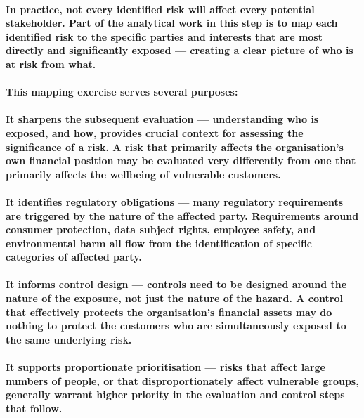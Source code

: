 \paragraph{In practice, not every identified risk will affect every potential stakeholder. Part of the analytical work in this step is to map each identified risk to the specific parties and interests that are most directly and significantly exposed — creating a clear picture of who is at risk from what.}
\paragraph{This mapping exercise serves several purposes:}
\paragraph{\textbf{It sharpens the subsequent evaluation} — understanding who is exposed, and how, provides crucial context for assessing the significance of a risk. A risk that primarily affects the organisation's own financial position may be evaluated very differently from one that primarily affects the wellbeing of vulnerable customers.}
\paragraph{\textbf{It identifies regulatory obligations} — many regulatory requirements are triggered by the nature of the affected party. Requirements around consumer protection, data subject rights, employee safety, and environmental harm all flow from the identification of specific categories of affected party.}
\paragraph{\textbf{It informs control design} — controls need to be designed around the nature of the exposure, not just the nature of the hazard. A control that effectively protects the organisation's financial assets may do nothing to protect the customers who are simultaneously exposed to the same underlying risk.}
\paragraph{\textbf{It supports proportionate prioritisation} — risks that affect large numbers of people, or that disproportionately affect vulnerable groups, generally warrant higher priority in the evaluation and control steps that follow.}
